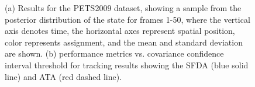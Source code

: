 \documentclass[twocolumn, final]{svjour3}
\begin{document}
\begin{figure}[!]
  \centering
  \hspace{4mm}
  \caption{ (a) Results for the PETS2009 dataset, showing a sample from the posterior distribution of the state for frames 1-50, where the vertical axis denotes time, the horizontal axes represent spatial position, color represents assignment, and the mean and standard deviation are shown. (b) performance metrics vs. covariance confidence interval threshold for tracking results showing the SFDA (blue solid line) and ATA (red dashed line).}
  \label{fig:pets2009_results}
\end{figure}
\end{document}
